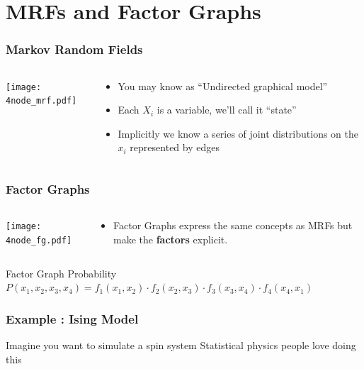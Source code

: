 \documentclass[compress]{beamer}
\begin{document}
\section{MRFs and Factor Graphs}
\frame{\tableofcontents[currentsection]}
\begin{frame}
  \frametitle{Markov Random Fields}
  \begin{columns}
    \begin{column}{5cm}
      \texttt{[image: 4node\_mrf.pdf]}
    \end{column}
    \begin{column}{5cm}
      \begin{itemize}
        \item You may know as ``Undirected graphical model'' 
        \item Each $X_i$ is a variable, we'll call it ``state'' 
          \item Implicitly we know a series of joint distributions on the $x_i$ represented by edges
        \end{itemize}
    \end{column}
  \end{columns}
\end{frame}

\begin{frame}
  \frametitle{Factor Graphs}
  \begin{columns}
    \begin{column}{5cm}
      \texttt{[image: 4node\_fg.pdf]}
    \end{column}
    \begin{column}{5cm}
      \begin{itemize}
        \item Factor Graphs \cite{kschischang_factor_2001} express the same concepts
          as MRFs but make the \textbf{factors} explicit. 
        \end{itemize}
    \end{column}
  \end{columns}
  \begin{block}{Factor Graph Probability}
    $P(x_1, x_2, x_3, x_4) = f_1(x_1, x_2) \cdot f_2(x_2, x_3) \cdot f_3(x_3, x_4) \cdot f_4(x_4, x_1)$
  \end{block}
\end{frame}

\begin{frame}
  \frametitle{Example : Ising Model}
  Imagine you want to simulate a spin system
  Statistical physics people love doing this

\end{frame}
\end{document}
